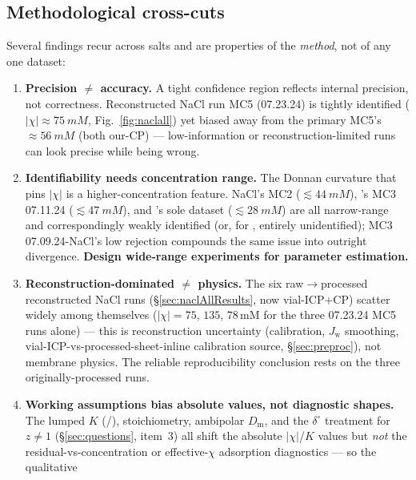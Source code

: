 \documentclass[11pt]{article}
\newcommand{\Jw}{J_{\mathrm{w}}}
\newcommand{\Dm}{D_{\mathrm{m}}}
\begin{document}
\subsection{Methodological cross-cuts}\label{sec:crosscuts}
Several findings recur across salts and are properties of the
\emph{method}, not of any one dataset:
\begin{enumerate}[itemsep=3pt]
  \item \textbf{Precision $\ne$ accuracy.} A tight confidence region reflects
        internal precision, not correctness. Reconstructed NaCl run MC5
        (07.23.24) is tightly identified ($|\chi|\approx\SI{75}{mM}$,
        Fig.~\ref{fig:naclall}) yet biased away from the primary MC5's
        $\approx\SI{56}{mM}$ (both our-CP) --- low-information or
        reconstruction-limited
        runs can look precise while being wrong.
  \item \textbf{Identifiability needs concentration range.} The Donnan
        curvature that pins $|\chi|$ is a higher-concentration feature.
        NaCl's MC2 ($\lesssim\SI{44}{mM}$), 's MC3 07.11.24
        ($\lesssim\SI{47}{mM}$), and 's sole dataset
        ($\lesssim\SI{28}{mM}$) are all narrow-range and correspondingly
        weakly identified (or, for , entirely unidentified); MC3
        07.09.24-NaCl's low rejection compounds the same issue into outright
        divergence. \textbf{Design wide-range experiments for parameter
        estimation.}
  \item \textbf{Reconstruction-dominated $\ne$ physics.} The six
        raw$\to$processed reconstructed NaCl runs (\S\ref{sec:naclAllResults},
        now vial-ICP$+$CP)
        scatter widely among themselves ($|\chi|=75$, $135$, $78$\,mM for
        the three 07.23.24 MC5 runs alone) --- this is reconstruction
        uncertainty (calibration, $\Jw$ smoothing, vial-ICP-vs-processed-sheet-inline
        calibration source, \S\ref{sec:preproc}), not membrane physics. The
        reliable
        reproducibility conclusion rests on the three originally-processed
        runs.
  \item \textbf{Working assumptions bias absolute values, not diagnostic
        shapes.} The lumped $K$ (/), 
        stoichiometry, ambipolar $\Dm$, and the $\delta^{\circ}$ treatment
        for $z\ne1$ (\S\ref{sec:questions}, item~3) all shift the absolute
        $|\chi|$/$K$ values but \emph{not} the residual-vs-concentration or
        effective-$\chi$ adsorption diagnostics --- so the qualitative

\end{enumerate}
\end{document}
